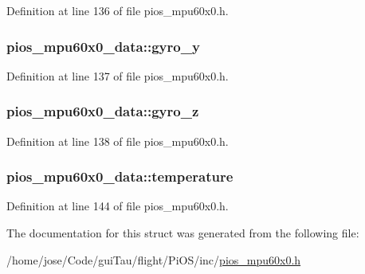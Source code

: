 Definition at line 136 of file pios\-\_\-mpu60x0.\-h.

\hypertarget{structpios__mpu60x0__data_afdb7be8323e08a88d0e6c4909a868ad4}{
\subsubsection[{gyro\-\_\-y}]{ pios\-\_\-mpu60x0\-\_\-data\-::gyro\-\_\-y}}\label{structpios__mpu60x0__data_afdb7be8323e08a88d0e6c4909a868ad4}


Definition at line 137 of file pios\-\_\-mpu60x0.\-h.

\hypertarget{structpios__mpu60x0__data_a526ba51edf822da11f9a97d1eef8c1e3}{
\subsubsection[{gyro\-\_\-z}]{ pios\-\_\-mpu60x0\-\_\-data\-::gyro\-\_\-z}}\label{structpios__mpu60x0__data_a526ba51edf822da11f9a97d1eef8c1e3}


Definition at line 138 of file pios\-\_\-mpu60x0.\-h.

\hypertarget{structpios__mpu60x0__data_a799b825b01a55b144c922827bb39d5e1}{
\subsubsection[{temperature}]{ pios\-\_\-mpu60x0\-\_\-data\-::temperature}}\label{structpios__mpu60x0__data_a799b825b01a55b144c922827bb39d5e1}


Definition at line 144 of file pios\-\_\-mpu60x0.\-h.



The documentation for this struct was generated from the following file\-:\begin{DoxyCompactItemize}
\item 
/home/jose/\-Code/gui\-Tau/flight/\-Pi\-O\-S/inc/\hyperlink{pios__mpu60x0_8h}{pios\-\_\-mpu60x0.\-h}\end{DoxyCompactItemize}
